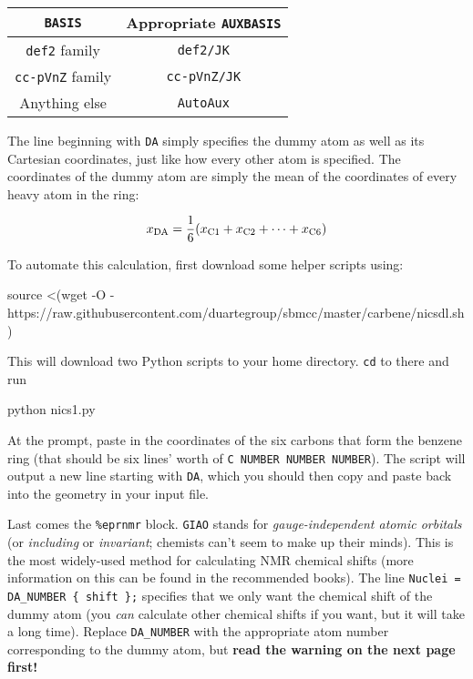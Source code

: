 \documentclass[10pt]{article}
\begin{document}
\begin{center}
    \begin{tabular}{cc}
        \toprule
        \texttt{BASIS} & Appropriate \texttt{AUXBASIS} \\ \midrule
        \texttt{def2} family & \texttt{def2/JK} \\
        \texttt{cc-pVnZ} family & \texttt{cc-pVnZ/JK} \\
        Anything else & \texttt{AutoAux} \\
        \bottomrule
    \end{tabular}
\end{center}

The line beginning with \texttt{DA} simply specifies the dummy atom as well as its Cartesian coordinates, just like how every other atom is specified. The coordinates of the dummy atom are simply the mean of the coordinates of every heavy atom in the ring:

\[ x_{\ce{DA}} = \frac{1}{6}(x_{\ce{C}1} + x_{\ce{C}2} + \cdots + x_{\ce{C}6}) \]

To automate this calculation, first download some helper scripts using:

\begin{cmdline}
source <(wget -O - https://raw.githubusercontent.com/duartegroup/sbmcc/master/carbene/nicsdl.sh)
\end{cmdline}

This will download two Python scripts to your home directory. \texttt{cd} to there and run

\begin{cmdline}
python nics1.py
\end{cmdline}

At the prompt, paste in the coordinates of the six carbons that form the benzene ring (that should be six lines' worth of \texttt{C   NUMBER   NUMBER   NUMBER}). The script will output a new line starting with \texttt{DA}, which you should then copy and paste back into the geometry in your input file.

Last comes the \texttt{\%eprnmr} block. \texttt{GIAO} stands for \textit{gauge-independent atomic orbitals} (or \textit{including} or \textit{invariant}; chemists can't seem to make up their minds). This is the most widely-used method for calculating NMR chemical shifts (more information on this can be found in the recommended books). The line \texttt{Nuclei = DA\_NUMBER \{ shift \};} specifies that we only want the chemical shift of the dummy atom (you \textit{can} calculate other chemical shifts if you want, but it will take a long time). Replace \texttt{DA\_NUMBER} with the appropriate atom number corresponding to the dummy atom, but \textbf{read the warning on the next page first!}
\end{document}
